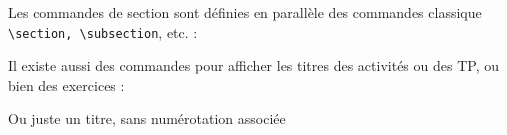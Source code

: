 \documentclass[12pt]{extarticle}
\begin{document}


\addtocounter{part}{-1}
\addtocounter{section}{-1}
Les commandes de section sont définies en parallèle des commandes classique \lstinline|\section, \subsection|, etc. :
\begin{boiteCodeTex}{}


\end{boiteCodeTex}

Il existe aussi des commandes pour afficher les titres des activités ou des TP, ou bien des exercices :
\begin{boiteCodeTex}{}

\end{boiteCodeTex}

Ou juste un titre, sans numérotation associée
\begin{boiteCodeTex}{}
\end{boiteCodeTex}

\end{document}
